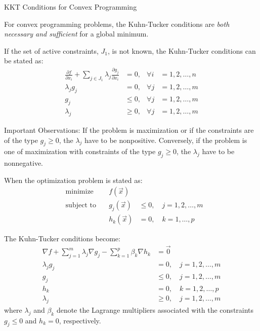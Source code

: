 \documentclass[
    NAME={Dr. Helga Ingimundardóttir},
    EMAIL={helgaingim@hi.is},
    FACULTY={Industrial Engineering},
    TITLE={Nonlinear Optimization},
    SUBTITLE={Approaches and Challenges},
    SEMINAR={VÉL113F},
    DATE={Design and Optimization}
]{../HI-latex/hi-beamer}
\begin{document}
    \begin{frame}{KKT Conditions for Convex Programming}

        For convex programming problems, the Kuhn-Tucker conditions are \emph{both necessary and sufficient} for a
        global minimum.

        If the set of active constraints, $J_1$, is not known, the Kuhn-Tucker conditions can be stated as:
        \begin{align*}
            \frac{\partial f}{\partial x_i} + \sum_{j \in J_1} \lambda_j \frac{\partial g_j}{\partial x_i} &= 0, &\forall i &= 1, 2, \ldots, n \\
            \lambda_j g_j &= 0, &\forall j &= 1, 2, \ldots, m \\
            g_j &\leq 0, &\forall j &= 1, 2, \ldots, m \\
            \lambda_j &\geq 0, &\forall j &= 1, 2, \ldots, m
        \end{align*}

        {\footnotesize
        \alert{Important Observations:}
        If the problem is maximization or if the constraints are of the type \(g_j \geq 0\), the \(\lambda_j\) have
        to be nonpositive.
        Conversely, if the problem is one of maximization with constraints of the type \(g_j \geq 0\), the
            \(\lambda_j\) have to be nonnegative.}

        \framebreak

        When the optimization problem is stated as:
        \begin{align*}
            &\text{minimize} \quad &f(\vec{x}) &\\
            &\text{subject to} \quad &g_j(\vec{x}) &\leq 0, \quad j = 1,2,\ldots,m \\
            & &h_k(\vec{x}) &=  0, \quad k = 1,\ldots,p
        \end{align*}

        The Kuhn-Tucker conditions become:
            {\small\begin{align*}
                       \nabla f + \sum_{j=1}^m \lambda_j \nabla g_j - \sum_{k=1}^p \beta_k \nabla h_k &= \vec{0} \\
                       \lambda_j g_j &= 0, \quad j=1,2,\ldots,m \\
                       g_j &\leq 0, \quad j=1,2,\ldots,m \\
                       h_k &= 0, \quad k=1,2,\ldots,p \\
                       \lambda_j &\geq 0, \quad j=1,2,\ldots,m
        \end{align*}}
        where $\lambda_j$ and $\beta_k$ denote the Lagrange multipliers associated with the constraints
        \( g_j \leq 0 \) and \( h_k = 0 \), respectively.

    \end{frame}
\end{document}
